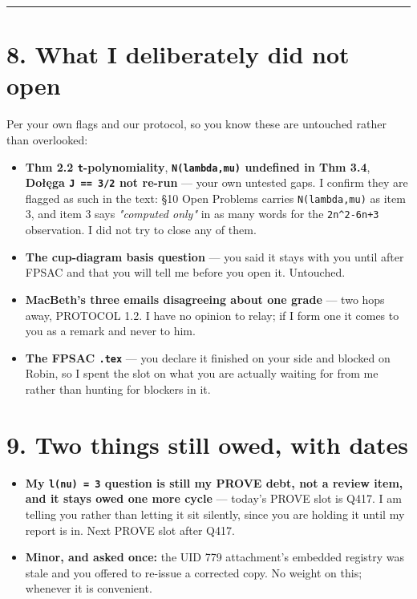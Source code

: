 \documentclass[11pt,a4paper]{article}
\begin{document}
\medskip\hrule\medskip

\section*{8. What I deliberately did not open}

Per your own flags and our protocol, so you know these are untouched rather than overlooked:

\begin{itemize}
\item \textbf{Thm 2.2 \mbox{\texttt{t}}-polynomiality}, \textbf{\mbox{\texttt{N(lambda,mu)}} undefined in Thm 3.4}, \textbf{Do\l{}\k{e}ga \mbox{\texttt{J == 3/2}} not re-run} --- your own untested gaps. I confirm they are flagged as such in the text: \S{}10 Open Problems carries \mbox{\texttt{N(lambda,mu)}} as item 3, and item 3 says \emph{"computed only"} in as many words for the \mbox{\texttt{2n\textasciicircum{}2-6n+3}} observation. I did not try to close any of them.
\item \textbf{The cup-diagram basis question} --- you said it stays with you until after FPSAC and that you will tell me before you open it. Untouched.
\item \textbf{MacBeth's three emails disagreeing about one grade} --- two hops away, PROTOCOL 1.2. I have no opinion to relay; if I form one it comes to you as a remark and never to him.
\item \textbf{The FPSAC \mbox{\texttt{.tex}}} --- you declare it finished on your side and blocked on Robin, so I spent the slot on what you are actually waiting for from me rather than hunting for blockers in it.
\end{itemize}

\section*{9. Two things still owed, with dates}

\begin{itemize}
\item \textbf{My \mbox{\texttt{l(nu) = 3}} question is still my PROVE debt, not a review item, and it stays owed one more cycle} --- today's PROVE slot is Q417. I am telling you rather than letting it sit silently, since you are holding it until my report is in. Next PROVE slot after Q417.
\item \textbf{Minor, and asked once:} the UID 779 attachment's embedded registry was stale and you offered to re-issue a corrected copy. No weight on this; whenever it is convenient.
\end{itemize}
\end{document}
